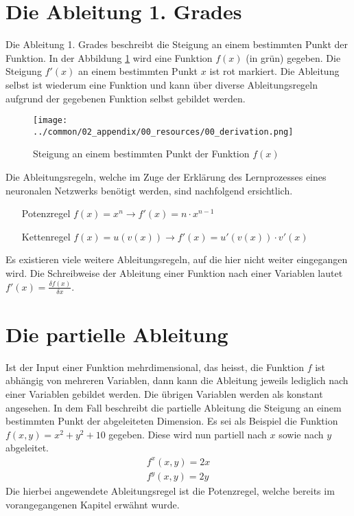 \section{Die Ableitung 1. Grades}
Die Ableitung 1. Grades beschreibt die Steigung an einem bestimmten Punkt der Funktion. In der Abbildung \ref{fig:00_steigung_an_punkt}
wird eine Funktion $f(x)$ (in grün) gegeben. Die Steigung $f'(x)$ an einem bestimmten Punkt $x$ ist rot markiert.
Die Ableitung selbst ist wiederum eine Funktion und kann über diverse Ableitungsregeln aufgrund der gegebenen Funktion
selbst gebildet werden.
\begin{figure}[h!]
    \begin{center}
        \texttt{[image: ../common/02\_appendix/00\_resources/00\_derivation.png]}
    \end{center}
    \caption{Steigung an einem bestimmten Punkt der Funktion $f(x)$}
    \label{fig:00_steigung_an_punkt}
\end{figure}

Die Ableitungsregeln, welche im Zuge der Erklärung des Lernprozesses eines neuronalen Netzwerks benötigt werden,
sind nachfolgend ersichtlich.
\begin{itemize}
    \item[Potenzregel] $f(x) = x^n \longrightarrow f'(x) = n \cdot x^{n-1}$\label{abl:potenzregel}
    \item[Kettenregel] $f(x) = u(v(x)) \longrightarrow f'(x) = u'(v(x)) \cdot v'(x)$\label{abl:kettenregel}
\end{itemize}
Es existieren viele weitere Ableitungsregeln, auf die hier nicht weiter eingegangen wird.
Die Schreibweise der Ableitung einer Funktion nach einer Variablen lautet $f'(x) = \frac{\delta f(x)}{\delta x}$.

\section{Die partielle Ableitung}
Ist der Input einer Funktion mehrdimensional, das heisst, die Funktion $f$ ist abhängig von mehreren Variablen, dann
kann die Ableitung jeweils lediglich nach einer Variablen gebildet werden. Die übrigen Variablen werden als konstant
angesehen. In dem Fall beschreibt die partielle Ableitung die Steigung an einem bestimmten Punkt der abgeleiteten
Dimension. Es sei als Beispiel die Funktion $f(x, y) = x^2 + y^2 + 10$ gegeben. Diese wird nun partiell nach $x$ sowie
nach $y$ abgeleitet.
\begin{align}
    f^x(x, y) = 2x\\
    f^y(x, y) = 2y
\end{align}
Die hierbei angewendete Ableitungsregel ist die Potenzregel, welche bereits im vorangegangenen Kapitel erwähnt wurde.

